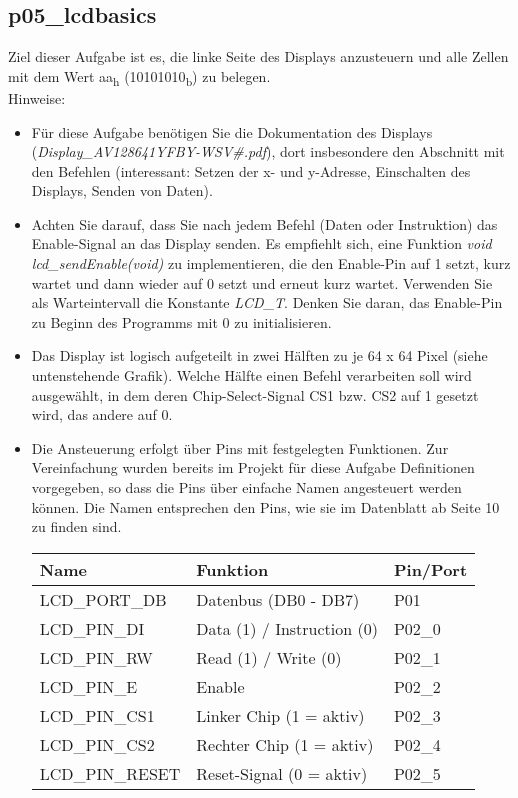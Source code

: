 \documentclass[
  accentcolor=tud1c,	%
  colorbacktitle,		%
  inverttitle,			%
  german,				%
  twoside
]{tudexercise}
\begin{document}
\subsection{p05\_lcdbasics}
Ziel dieser Aufgabe ist es, die linke Seite des Displays anzusteuern und alle Zellen mit dem Wert aa\textsubscript{h} (10101010\textsubscript{b}) zu belegen.\\
Hinweise:
\begin{itemize}
\item
Für diese Aufgabe benötigen Sie die Dokumentation des Displays (\textit{Display\_AV128641YFBY-WSV\#.pdf}), dort insbesondere den Abschnitt mit den Befehlen (interessant: Setzen der x- und y-Adresse, Einschalten des Displays, Senden von Daten).

\item
Achten Sie darauf, dass Sie nach jedem Befehl (Daten oder Instruktion) das Enable-Signal an das Display senden.
Es empfiehlt sich, eine Funktion \textit{void lcd\_sendEnable(void)} zu implementieren, die den Enable-Pin auf 1 setzt, kurz wartet und dann wieder auf 0 setzt und erneut kurz wartet. Verwenden Sie als Warteintervall die Konstante \emph{LCD\_T}. Denken Sie daran, das Enable-Pin zu Beginn des Programms mit 0 zu initialisieren.

\item
Das Display ist logisch aufgeteilt in zwei Hälften zu je 64 x 64 Pixel (siehe untenstehende Grafik).
Welche Hälfte einen Befehl verarbeiten soll wird ausgewählt, in dem deren Chip-Select-Signal CS1 bzw. CS2 auf 1 gesetzt wird, das andere auf 0.

\item Die Ansteuerung erfolgt über Pins mit festgelegten Funktionen. Zur Vereinfachung wurden bereits im Projekt für diese Aufgabe Definitionen vorgegeben, so dass die Pins über einfache Namen angesteuert werden können. Die Namen entsprechen den Pins, wie sie im Datenblatt ab Seite 10 zu finden sind.

\begin{center}
\begin{tabular}{l|l|l}
	\toprule
\textbf{Name} & \textbf{Funktion} & \textbf{Pin/Port} \\ 
 \midrule
LCD\_PORT\_DB & Datenbus (DB0 - DB7) & P01 \\ 
LCD\_PIN\_DI & Data (1) / Instruction (0) & P02\_0 \\ 
LCD\_PIN\_RW & Read (1) / Write (0) & P02\_1 \\ 
LCD\_PIN\_E & Enable & P02\_2 \\ 
LCD\_PIN\_CS1 & Linker Chip (1 = aktiv) & P02\_3 \\ 
LCD\_PIN\_CS2 & Rechter Chip (1 = aktiv) & P02\_4 \\ 
LCD\_PIN\_RESET & Reset-Signal (0 = aktiv) & P02\_5 \\ 
\bottomrule
\end{tabular}
\end{center}


\end{itemize}
\end{document}
